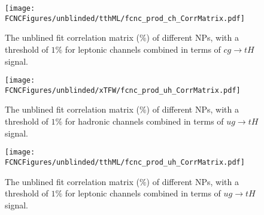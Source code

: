 \begin{figure}[H]
\centering
\texttt{[image: \\FCNCFigures/unblinded/tthML/fcnc\_prod\_ch\_CorrMatrix.pdf]}
\caption{ The unblined fit correlation matrix ($\%$) of different NPs, with a threshold of $1\%$ for leptonic channels combined in terms of $cg\to tH$ signal.}
\label{fig:fcnc_prod_ch_CorrMatrix_2}
\end{figure}

\begin{figure}[H]
\centering
\texttt{[image: \\FCNCFigures/unblinded/xTFW/fcnc\_prod\_uh\_CorrMatrix.pdf]}
\caption{ The unblined fit correlation matrix ($\%$) of different NPs, with a threshold of $1\%$ for hadronic channels combined in terms of $ug\to tH$ signal.}
\label{fig:fcnc_prod_uh_CorrMatrix_1}
\end{figure}

\begin{figure}[H]
\centering
\texttt{[image: \\FCNCFigures/unblinded/tthML/fcnc\_prod\_uh\_CorrMatrix.pdf]}
\caption{ The unblined fit correlation matrix ($\%$) of different NPs, with a threshold of $1\%$ for leptonic channels combined in terms of $ug\to tH$ signal.}
\label{fig:fcnc_prod_uh_CorrMatrix_2}
\end{figure}











\newpage
